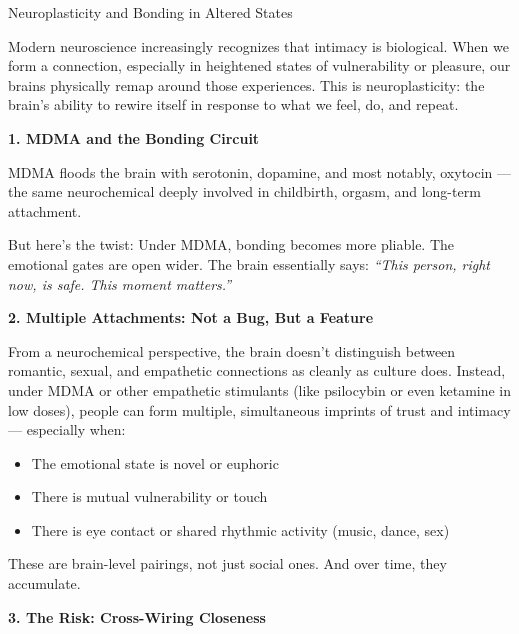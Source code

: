 \begin{TechnicalSidebar}{Neuroplasticity and Bonding in Altered States}

  Modern neuroscience increasingly recognizes that intimacy is  biological.
  When we form a connection, especially in heightened states of vulnerability or pleasure, 
  our brains physically remap around those experiences. This is neuroplasticity: the brain’s 
  ability to rewire itself in response to what we feel, do, and repeat.
  
  \medskip
  
  \textbf{1. MDMA and the Bonding Circuit}
  
  MDMA floods the brain with serotonin, dopamine, and most notably, oxytocin — the same neurochemical 
  deeply involved in childbirth, orgasm, and long-term attachment.

  \medskip
  
  
  But here’s the twist:
  Under MDMA, bonding becomes more pliable. The emotional gates are open wider.
  The brain essentially says:
  \textit{“This person, right now, is safe. This moment matters.”}
  
  \medskip
  
  \textbf{2. Multiple Attachments: Not a Bug, But a Feature}

  \medskip
  
  
  From a neurochemical perspective, the brain doesn’t distinguish between romantic, sexual, and empathetic 
  connections as cleanly as culture does.
  Instead, under MDMA or other empathetic stimulants (like psilocybin or even ketamine in low doses), 
  people can form multiple, simultaneous imprints of trust and intimacy — especially when:

  \medskip
  
  
  \begin{itemize}
    \item The emotional state is novel or euphoric
    \item There is mutual vulnerability or touch
    \item There is eye contact or shared rhythmic activity (music, dance, sex)
  \end{itemize}

  \medskip
  
  
  These are brain-level pairings, not just social ones.
  And over time, they accumulate.
  
  \medskip
  
  \textbf{3. The Risk: Cross-Wiring Closeness}


\end{TechnicalSidebar}
